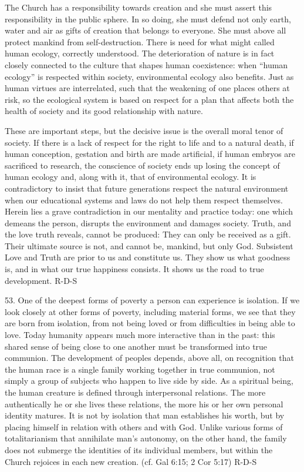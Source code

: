 \documentclass[oneside]{book}
\begin{document}
The Church has a responsibility towards creation and she must assert this
responsibility in the public sphere. In so doing, she must defend not only
earth, water and air as gifts of creation that belongs to everyone. She must
above all protect mankind from self-destruction. There is need for what might
called human ecology, correctly understood. The deterioration of nature is in
fact closely connected to the culture that shapes human coexistence: when
``human ecology'' is respected within society, environmental ecology also
benefits. Just as human virtues are interrelated, such that the weakening of one
places others at risk, so the ecological system is based on respect for a plan
that affects both the health of society and its good relationship with nature.

These are important steps, but the decisive issue is the overall moral tenor of
society. If there is a lack of respect for the right to life and to a natural
death, if human conception, gestation and birth are made artificial, if human
embryos are sacrificed to research, the conscience of society ends up losing the
concept of human ecology and, along with it, that of environmental ecology. It
is contradictory to insist that future generations respect the natural
environment when our educational systems and laws do not help them respect
themselves. Herein lies a grave contradiction in our mentality and practice
today: one which demeans the person, disrupts the environment and damages
society. Truth, and the love truth reveals, cannot be produced: They can only be
received as a gift. Their ultimate source is not, and cannot be, mankind, but
only God. Subsistent Love and Truth are prior to us and constitute us. They show
us what goodness is, and in what our true happiness consists. It shows us the
road to true development.
R-D-S

53. One of the deepest forms of poverty a person can experience is isolation. If
we look closely at other forms of poverty, including material forms, we see that
they are born from isolation, from not being loved or from difficulties in being
able to love. Today humanity appears much more interactive than in the past:
this shared sense of being close to one another must be transformed into true
communion. The development of peoples depends, above all, on recognition that
the human race is a single family working together in true communion, not simply
a group of subjects who happen to live side by side. As a spiritual being, the
human creature is defined through interpersonal relations. The more
authentically he or she lives these relations, the more his or her own personal
identity matures. It is not by isolation that man establishes his worth, but by
placing himself in relation with others and with God. Unlike various forms of
totalitarianism that annihilate man's autonomy, on the other hand, the family
does not submerge the identities of its individual members, but within the
Church rejoices in each new creation. (cf. Gal 6:15; 2 Cor 5:17)
R-D-S
\end{document}
